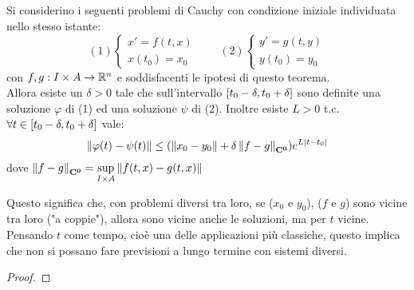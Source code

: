 \begin{theorem}
	\label{teo:cau_locale_part_2}
	Si considerino i seguenti problemi di Cauchy con condizione iniziale individuata nello stesso istante:
	$$(1)\begin{cases}x'=f(t,x)\\x(t_0)=x_0\end{cases}\qquad
	(2)\begin{cases}y'=g(t,y)\\y(t_0)=y_0\end{cases}$$
	con $f,g:I\times A \to \mathbb{R}^n$ e soddisfacenti le ipotesi di questo teorema.\\
	Allora esiste un $\delta >0$ tale che sull'intervallo $\left[t_0-\delta,t_0+\delta\right]$ sono definite una soluzione $\varphi$ di (1) ed una soluzione $\psi$ di (2). Inoltre esiste $L>0$ t.c. $\forall t\in \left[t_0-\delta,t_0+\delta\right]$ vale:
	$$\left\|\varphi(t)-\psi(t)\right\| \le (\left\|x_0-y_0\right\|+\delta\left\|f-g\right\|_{\mathbf{C^{0}}})e^{L\left|t-t_0\right|}$$
	dove $\left\|f-g\right\|_{\mathbf{C^{0}}}=\sup\limits_{I\times A}\left\|f(t,x)-g(t,x)\right\|$
	\begin{note}
		Questo significa che, con problemi diversi tra loro, se ($x_0$ e $y_0$), ($f$ e $g$) sono vicine tra loro ("a coppie"), allora sono vicine anche le soluzioni, ma per $t$ vicine.
		Pensando $t$ come tempo, cioè una delle applicazioni più classiche, questo implica che non si possano fare previsioni a lungo termine con sistemi diversi.
	\end{note}
	\begin{proof}
		
	\end{proof}
\end{theorem}


